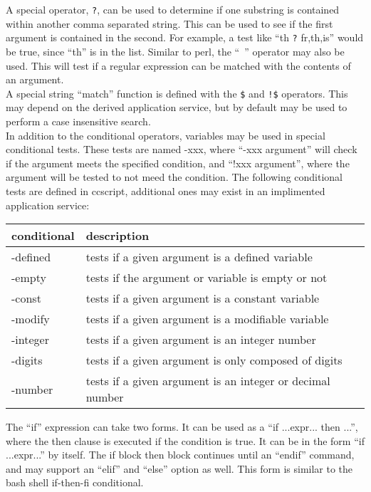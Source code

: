 \documentclass[a4paper,12pt]{article}
\begin{document}
A special operator, \verb|?|, can be used to determine if one substring is
contained within another comma separated string.  This can be used to see if
the first argument is contained in the second.  For example, a test like ``th
\verb|?| fr,th,is'' would be true, since ``th'' is in the list.  Similar to perl, the
``~'' operator may also be used.  This will test if a regular expression can be
matched with the contents of an argument. \\

A special string ``match'' function is defined with the \verb|$| and \verb|!$|
operators.  This may depend on the derived application service, but by
default may be used to perform a case insensitive search. \\

In addition to the conditional operators, variables may be used in special 
conditional tests.  These tests are named -xxx, where ``-xxx argument'' 
will check if the argument meets the specified condition, and ``!xxx 
argument'', where the argument will be tested to not meed the condition.  
The following conditional tests are defined in ccscript, additional ones
may exist in an implimented application service: \\

\begin{tabular}{|l|l|}
\hline
\textbf{conditional}      & \textbf{description} \\
\hline
-defined        & tests if a given argument is a defined variable \\
-empty          & tests if the argument or variable is empty or not \\
-const          & tests if a given argument is a constant variable \\
-modify			& tests if a given argument is a modifiable variable \\
-integer		& tests if a given argument is an integer number \\
-digits			& tests if a given argument is only composed of digits \\
-number			& tests if a given argument is an integer or decimal number \\
\hline
\end{tabular}

The ``if'' expression can take two forms.  It can be used as a ``if ...expr...
then ...'', where the then clause is executed if the condition is true.  It can
be in the form ``if ...expr...'' by itself.  The if block then block continues
until an ``endif'' command, and may support an ``elif'' and ``else'' option as
well.  This form is similar to the bash shell if-then-fi conditional.  \\
\end{document}
